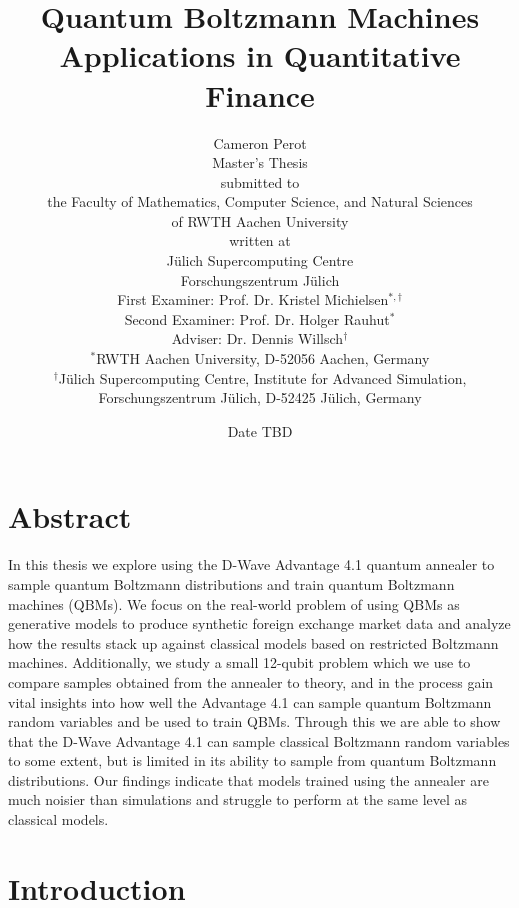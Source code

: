 \documentclass[11pt,twoside]{report}
\title{
    {Quantum Boltzmann Machines}\\
    {\large Applications in Quantitative Finance}
}
\author{
    {\LARGE Cameron Perot\vspace{1cm}}\\
    {Master's Thesis\vspace{0.1cm}}\\
    {\small submitted to\vspace{0.1cm}}\\
    {the Faculty of Mathematics, Computer Science, and Natural Sciences}\\
    {of RWTH Aachen University\vspace{0.1cm}}\\
    {\small written at\vspace{0.1cm}}\\
    {Jülich Supercomputing Centre}\\
    {Forschungszentrum Jülich\vspace{1cm}}\\
    {First Examiner: Prof. Dr. Kristel Michielsen\( ^{*,\dag} \)}\\
    {Second Examiner: Prof. Dr. Holger Rauhut\( ^* \)}\\
    {Adviser: Dr. Dennis Willsch\( ^\dag \)\vspace{0.1cm}}\\
    {\footnotesize\( ^* \)RWTH Aachen University, D-52056 Aachen, Germany}\\
    {\footnotesize\( ^\dag \)Jülich Supercomputing Centre, Institute for Advanced Simulation,}\\
    {\footnotesize Forschungszentrum Jülich, D-52425 Jülich, Germany\vspace{0.5cm}}
}
\date{Date TBD}
\begin{document}
\maketitle
{}

\clearpage\shipout\null
\chapter*{Abstract}

In this thesis we explore using the D-Wave Advantage 4.1 quantum annealer to sample quantum Boltzmann distributions and train quantum Boltzmann machines (QBMs).
We focus on the real-world problem of using QBMs as generative models to produce synthetic foreign exchange market data and analyze how the results stack up against classical models based on restricted Boltzmann machines.
Additionally, we study a small 12-qubit problem which we use to compare samples obtained from the annealer to theory, and in the process gain vital insights into how well the Advantage 4.1 can sample quantum Boltzmann random variables and be used to train QBMs.
Through this we are able to show that the D-Wave Advantage 4.1 can sample classical Boltzmann random variables to some extent, but is limited in its ability to sample from quantum Boltzmann distributions.
Our findings indicate that models trained using the annealer are much noisier than simulations and struggle to perform at the same level as classical models.

\clearpage\shipout\null

\tableofcontents
\clearpage\shipout\null

\chapter{Introduction}
\label{ch:introduction}


\end{document}
